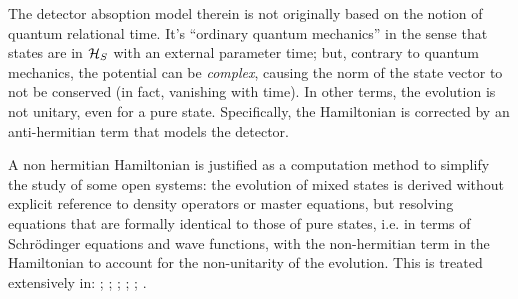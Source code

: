 
The detector absoption model therein is not originally
based on the notion of quantum relational time. It's ``ordinary quantum mechanics''
in the sense that states are in $\mathcal{H}_S$ with an external parameter time;
but, contrary to quantum mechanics, the potential can be \emph{complex},
causing the norm of the state vector to not be conserved (in fact, vanishing with time).
In other terms, the evolution is not unitary, even for a pure state.
Specifically, the Hamiltonian is corrected by an anti-hermitian term
that models the detector.

A non hermitian Hamiltonian is justified as a computation method
to simplify the study of some open systems: the evolution of mixed
states is derived without explicit reference to density operators
or master equations, but resolving equations that are formally
identical to those of pure states,
i.e. in terms of
Schr{\"o}dinger equations and wave functions,
with the non-hermitian term in the Hamiltonian
to account for the non-unitarity of the evolution.
%
This is treated extensively in:
  \cite[Ch. 6]{TQM2};
  \cite{Wave-function_approach};
  \cite{HowToResetAnAtom};
  \cite{TheQuantumJumpApproach};
  \cite[\S 8.5.2 ``The `quantum jump' approach to damping: The wave function Monte Carlo approach'']{ScullyZubairy};
  \cite[\S 6.7.1 ``Simulating Quantum Trajectories'']{WallsMilburn}.

